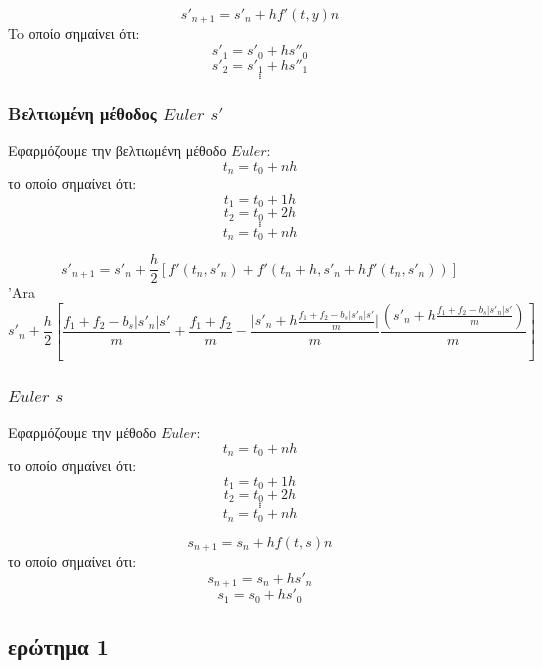 \documentclass[a4paper]{article}
\begin{document}
        \hrulefill{}

        \[s'_{n+1}=s'_n+hf'(t,y)n\]
        To οποίο σημαίνει ότι:
        \[s'_1=s'_0+hs''_0\]
        \[s'_2=s'_1+hs''_1\]
        \[.\]
        \[.\]
        \[.\]
        
        \subsubsection*{Bελτιωμένη μέθοδος $Euler$ $s'$}
        Εφαρμόζουμε την βελτιωμένη μέθοδο $Euler$:
        \[t_n=t_0+nh\]
        το οποίο σημαίνει ότι:
        \[t_1=t_0+1h\]
        \[t_2=t_0+2h\]
        \[.\]
        \[.\]
        \[.\]
        \[t_n=t_0+nh\]

        \hrulefill{}
        \[s'_{n+1}=s'_n+\frac{h}{2}{[f'(t_n, s'_n)+f'(t_n+h, s'_n+hf'(t_n,s'_n))]}\]
        'Ara
        \[s'_n+\frac{h}{2}{[\frac{f_1+f_2-b_s\rvert s'_n \lvert s'}{m}+\frac{f_1+f_2}{m}-\frac{\lvert s'_n+h\frac{f_1+f_2-b_s\rvert s'_n \lvert s'}{m}\rvert}{m}\frac{(s'_n+h\frac{f_1+f_2-b_s\rvert s'_n \lvert s'}{m})}{m}]}\]
        
        \subsubsection*{$Euler$ $s$}
        Εφαρμόζουμε την μέθοδο $Euler$:
        \[t_n=t_0+nh\]
        το οποίο σημαίνει ότι:
        \[t_1=t_0+1h\]
        \[t_2=t_0+2h\]
        \[.\]
        \[.\]
        \[.\]
        \[t_n=t_0+nh\]

        \hrulefill{}

        \[s_{n+1}=s_n+hf(t,s)n\]
        το οποίο σημαίνει ότι:
        \[s_{n+1}=s_n+hs'_n\]
        \[s_1=s_0+hs'_0\]

        \subsection{ερώτημα 1}
\end{document}
